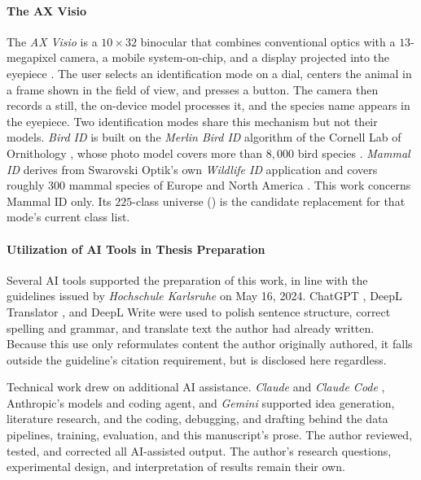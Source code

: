 \paragraph{The AX Visio}
The \textit{AX Visio} is a $10\times32$ binocular that combines conventional optics with a $13$-megapixel camera, a mobile system-on-chip, and a display projected into the eyepiece \cite{AXVisio}. The user selects an identification mode on a dial, centers the animal in a frame shown in the field of view, and presses a button. The camera then records a still, the on-device model processes it, and the species name appears in the eyepiece. Two identification modes share this mechanism but not their models. \textit{Bird ID} is built on the \textit{Merlin Bird ID} algorithm of the Cornell Lab of Ornithology \cite{AXVisio}, whose photo model covers more than $8{,}000$ bird species \cite{IdentifyBirdsPhotos}.
\textit{Mammal ID} derives from Swarovski Optik's own \textit{Wildlife ID} application and covers roughly $300$ mammal species of Europe and North America \cite{HowDoesSWAROVSKI}.
This work concerns Mammal ID only. Its $225$-class universe () is the candidate replacement for that mode's current class list.

\paragraph{Utilization of AI Tools in Thesis Preparation}
Several AI tools supported the preparation of this work, in line with the guidelines issued by \textit{Hochschule Karlsruhe} on May 16, 2024. ChatGPT \cite{ChatGPT}, DeepL Translator \cite{DeepLTranslateWorlds}, and DeepL Write \cite{DeepLWriteAIpowered} were used to polish sentence structure, correct spelling and grammar, and translate text the author had already written. Because this use only reformulates content the author originally authored, it falls outside the guideline's citation requirement, but is disclosed here regardless.

Technical work drew on additional AI assistance. \textit{Claude} \cite{AIProblemSolvers} and \textit{Claude Code} \cite{ClaudeCodeAnthropic}, Anthropic's models and coding agent, and \textit{Gemini} \cite{GeminiAPI} supported idea generation, literature research, and the coding, debugging, and drafting behind the data pipelines, training, evaluation, and this manuscript's prose. The author reviewed, tested, and corrected all AI-assisted output. The author's research questions, experimental design, and interpretation of results remain their own.

